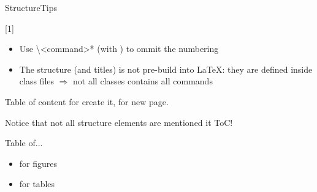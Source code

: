 \begin{frame}[fragile]{Structure}{Tips}\relax

[1]

\begin{itemize}
    \item Use {\csk \textbackslash<command>*} (with {\Large *}) to ommit the numbering
    \item The structure (and titles) is not pre-build into \LaTeX: they are defined inside class files $\Rightarrow$ not all classes contains all commands
     
\end{itemize}
\end{frame}

\begin{frame}[fragile]{Table of content}\relax
\cprotect{}
     \incPause \ccol{\tableofcontents} for create it, \ccol{\newpage} for new page.
     
     Notice that not all structure elements are mentioned it ToC!

     \cprotect{}
\end{frame}


\begin{frame}[fragile]{Table of...\magicPage}\relax
\Large
     \begin{itemize}
          \item \ccol{\listoffigures} for figures 
          \item \ccol{\listoftables} for tables 
     \end{itemize}
     
     \cprotect{}
\end{frame}
